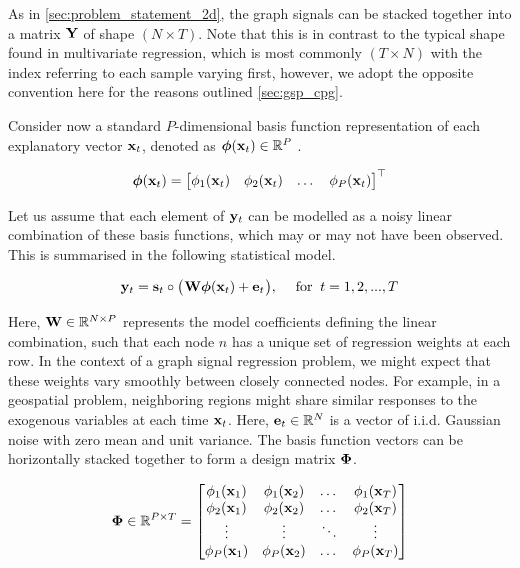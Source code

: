 As in \cref{sec:problem_statement_2d}, the graph signals can be stacked together into a matrix $\mathbf{Y}$ of shape $(N \times T)$. Note that this is in contrast to the typical shape found in multivariate regression, which is most commonly $(T \times N)$ with the index referring to each sample varying first, however, we adopt the opposite convention here for the reasons outlined \cref{sec:gsp_cpg}. 

Consider now a standard $P$-dimensional basis function representation of each explanatory vector $\mathbf{x}_t$, denoted as $\boldsymbol{\phi}(\mathbf{x}_t) \in \mathbb{R}^{P}$ \citep{Murphy2012}. 

\begin{equation}
    \boldsymbol{\phi}(\mathbf{x}_t) = 
    \begin{bmatrix}
        \phi_1(\mathbf{x}_t) & \phi_2(\mathbf{x}_t) & \dots & \phi_P(\mathbf{x}_t)
    \end{bmatrix}^\top
\end{equation}

Let us assume that each element of $\mathbf{y}_t$ can be modelled as a noisy linear combination of these basis functions, which may or may not have been observed. This is summarised in the following statistical model. 

\begin{equation}
    \mathbf{y}_t = \mathbf{s}_t \circ \big( \mspace{1mu} \mathbf{W} \boldsymbol{\phi}(\mathbf{x}_t) + \mathbf{e}_t \mspace{1mu} \big), \quad \; \text{for} \; \; t = 1, 2, ..., T
\end{equation}

Here, $\mathbf{W} \in \mathbb{R}^{N \times P}$ represents the model coefficients defining the linear combination, such that each node $n$ has a unique set of regression weights at each row. In the context of a graph signal regression problem, we might expect that these weights vary smoothly between closely connected nodes. For example, in a geospatial problem, neighboring regions might share similar responses to the exogenous variables at each time $\mathbf{x}_t$. Here, $\mathbf{e}_t \in \mathbb{R}^{N}$ is a vector of i.i.d. Gaussian noise with zero mean and unit variance. The basis function vectors can be horizontally stacked together to form a design matrix $\mathbf{\Phi}$. 

\begin{equation}
    \mathbf{\Phi} \in \mathbb{R}^{P \times T} = \begin{bmatrix} 
        \phi_1(\mathbf{x}_1) & \phi_1(\mathbf{x}_2) & \dots & \phi_1(\mathbf{x}_T) \\
        \phi_2(\mathbf{x}_1) & \phi_2(\mathbf{x}_2) & \dots & \phi_2(\mathbf{x}_T) \\
        \vdots & \vdots & \ddots & \vdots  \\
        \phi_P(\mathbf{x}_1) & \phi_P(\mathbf{x}_2) & \dots & \phi_P(\mathbf{x}_T) \\
    \end{bmatrix}
\end{equation}

